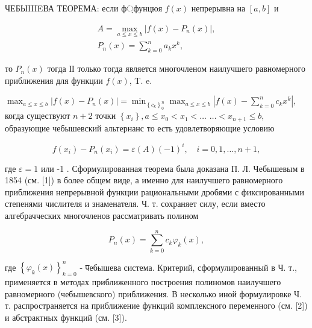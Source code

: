 \documentclass[10pt]{article}
\begin{document}
ЧЕБЫIIIEВА ТЕОРЕМА: если ф্фунцюя $f(x)$ непрерывна на $[a, b]$ и



\[

\begin{gathered}

A=\max _{a \leqslant x \leqslant b}\left|f(x)-P_{n}(x)\right|, \\

P_{n}(x)=\sum_{k=0}^{n} a_{k} x^{k},

\end{gathered}

\]



то $P_{n}(x)$ тогда ІІ только тогда является многочленом наилучшего равномерного приближения для функции $f(x)$, T. e.



$\max _{a \leqslant x \leqslant b}\left|f(x)-P_{n}(x)\right|=\min _{\left\{c_{k}\right\}_{0}^{n}} \max _{a \leqslant x \leqslant b}\left|f(x)-\sum_{k=0}^{n} c_{k} x^{k}\right|$, когда существуют $n+2$ точки $\left\{x_{i}\right\}, a \leqslant x_{0}<x_{1}<\ldots$ $\ldots<x_{n+1} \leqslant b$, образующие чебышевский альтернанс то есть удовлетворяющие условию



\[

f\left(x_{i}\right)-P_{n}\left(x_{i}\right)=\varepsilon(A)(-1)^{i}, \quad i=0,1, \ldots, n+1,

\]



где $\varepsilon=1$ или -1 . Сформулированная теорема была доказана П. Л. Чебышевым в 1854 (см. [1]) в более общем виде, а именно для наилучшего равномерного приближения непрерывной функции рациональными дробями с фиксированными степенями числителя и знаменателя. Ч. т. сохраняет силу, если вместо алгебрачческих многочленов рассматривать полином



\[

P_{n}(x)=\sum_{k=0}^{n} c_{k} \varphi_{k}(x),

\]



где $\left\{\varphi_{k}(x)\right\}_{k=0}^{n}$ - पебышева система. Критерий, сформулированный в Ч. т., применяется в методах приближенного построения полиномов наилучшего равномерного (чебышевского) приближения. В несколько иной формулировке Ч. т. распространяется на приближение функций комплексного переменного (см. [2]) и абстрактных функций (см. [3]).
\end{document}
